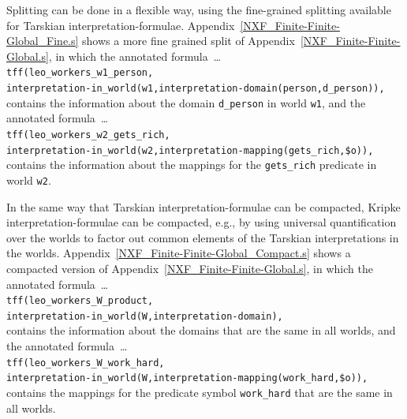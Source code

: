 \documentclass{easychair}
\newcommand{\smalltt}[1]{\small \texttt{#1}}
\begin{document}
Splitting can be done in a flexible way, using the fine-grained splitting available for
Tarskian interpretation-formulae.
Appendix~\ref{NXF_Finite-Finite-Global_Fine.s} shows a more fine grained split of 
Appendix~\ref{NXF_Finite-Finite-Global.s}, in which the annotated formula~\ldots \\
\hspace*{0.5cm}\smalltt{tff(leo\_workers\_w1\_person,} \\
\hspace*{0.8cm}\smalltt{interpretation-in\_world(w1,interpretation-domain(person,d\_person)),} \\
contains the information about the domain {\tt d\_person} in world {\tt w1}, and the annotated 
formula~\ldots \\
\hspace*{0.5cm}\smalltt{tff(leo\_workers\_w2\_gets\_rich,} \\
\hspace*{0.8cm}\smalltt{interpretation-in\_world(w2,interpretation-mapping(gets\_rich,\$o)),} \\
contains the information about the mappings for the {\tt gets\_rich} predicate in world {\tt w2}.

In the same way that Tarskian interpretation-formulae can be compacted, Kripke
interpretation-formulae can be compacted, e.g., by using universal quantification over the
worlds to factor out common elements of the Tarskian interpretations in the worlds.
Appendix~\ref{NXF_Finite-Finite-Global_Compact.s} shows a compacted version of
Appendix~\ref{NXF_Finite-Finite-Global.s}, in which the annotated formula~\ldots \\
\hspace*{0.5cm}\smalltt{tff(leo\_workers\_W\_product,} \\
\hspace*{0.8cm}\smalltt{interpretation-in\_world(W,interpretation-domain),} \\
contains the information about the domains that are the same in all worlds, and the 
annotated formula~\ldots \\
\hspace*{0.5cm}\smalltt{tff(leo\_workers\_W\_work\_hard,} \\
\hspace*{0.8cm}\smalltt{interpretation-in\_world(W,interpretation-mapping(work\_hard,\$o)),} \\
contains the mappings for the predicate symbol {\tt work\_hard} that are the same in all worlds.
\end{document}
